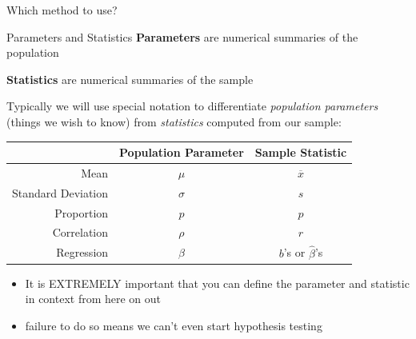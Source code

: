 \documentclass{beamer}
\begin{document}
\begin{frame}{Which method to use?}
\begin{center}
\end{center}
\end{frame}

\begin{frame}{Parameters and Statistics}
\textbf{Parameters} are numerical summaries of the population

\textbf{Statistics} are numerical summaries of the sample
\vspace{8mm}

Typically we will use special notation to differentiate \textit{population parameters} (things we wish to know) from \textit{statistics} computed from our sample:

\begin{table}[ht]
\centering
\begin{tabular}{rcc}
  \hline
 & Population Parameter & Sample Statistic \\ 
  \hline
Mean &   $\mu$ &   $\overline{x}$ \\ 
Standard Deviation &  $\sigma$ &   $s$ \\ 
Proportion & $p$ & $\hat{p}$ \\
Correlation & $\rho$ & $r$ \\
Regression & $\beta$ & $b$'s or $\hat{\beta}$'s \\
   \hline
\end{tabular}
\end{table} \vspace{2mm}
\begin{itemize}
    \item It is EXTREMELY important that you can define the parameter and statistic in context from here on out
    \item failure to do so means we can't even start hypothesis testing
\end{itemize}
\end{frame}
\end{document}
